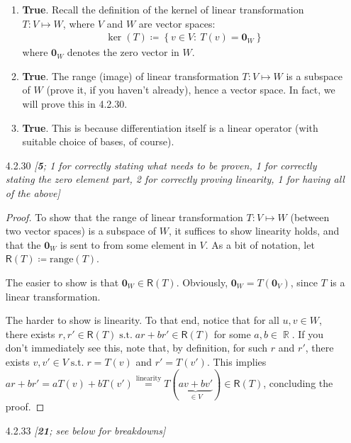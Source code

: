 \documentclass{amsart}
\theoremstyle{definition}
\theoremstyle{definition}
\DeclareMathOperator{\R}{\mathbb{R}}
\DeclareMathOperator{\suchthat}{\text{ s.t. }}
\DeclareMathOperator{\1}{\mathbbm{1}}
\newcommand{\zerov}{\mathbf{0}}
\newcommand{\rng}{\mathsf{R}}
\newcommand{\condset}[4]{\left\{ #1  : \: #2 #3 #4 \right\}}
\begin{document}
\begin{enumerate}[itemsep = 2mm]
\begin{enumerate}
			\item \textbf{True}. Recall the definition of the kernel of linear transformation $T : V \mapsto W$, where $V$ and $W$ are vector spaces:
			\begin{align*}
			\ker (T) \coloneqq \condset{v \in V}{T(v)}{=}{\zerov_{W}}
			\end{align*}			
			where $\zerov_W$ denotes the zero vector in $W$.
			
			\item \textbf{True}. The range (image) of linear transformation $T : V \mapsto W$ is a subspace of $W$ (prove it, if you haven't already), hence a vector space. In fact, we will prove this in 4.2.30.
			
			
			\item \textbf{True}. This is because differentiation itself is a linear operator (with suitable choice of bases, of course).
		\end{enumerate}
		
		
		\item[4.2.30] \textit{[\textbf{5}; 1 for correctly stating what needs to be proven, 1 for correctly stating the zero element part, 2 for correctly proving linearity, 1 for having all of the above]}
		
		\begin{proof}
			To show that the range of linear transformation $T: V \mapsto W$ (between two vector spaces) is a subspace of $W$, it suffices to show linearity holds, and that the $\zerov_W$ is sent to from some element in $V$. As a bit of notation, let $\rng(T) \coloneqq \text{range}(T)$.
			
			The easier to show is that $\zerov_W \in \rng(T)$. Obviously, $\zerov_W = T(\zerov_V)$, since $T$ is a linear transformation.
			
			The harder to show is linearity. To that end, notice that for all $u,v \in W$, there exists $r, r' \in \rng(T) \suchthat ar + br' \in \rng(T)$ for some $a,b \in \R$. If you don't immediately see this, note that, by definition, for such $r$ and $r'$, there exists $v, v' \in V \suchthat r= T(v)$ and $r' = T(v')$. This implies $ar + br' = aT(v) + b T(v') \stackrel{\text{linearity}}{=} T(\underbrace{av + bv'}_{\in V}) \in \rng(T)$, concluding the proof. 
		\end{proof}
		
		
		
		\item[4.2.33] \textit{[\textbf{21}; see below for breakdowns]}
		

\end{enumerate}
\end{document}

